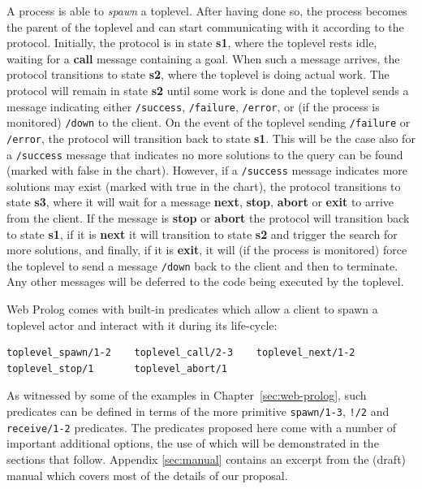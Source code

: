 A process is able to \textit{spawn} a toplevel. After having done so, the process becomes the parent of the toplevel and can start communicating with it according to the protocol. Initially, the protocol is in state \textbf{s1}, where the toplevel rests idle, waiting for a \textbf{call} message containing a goal. When such a message arrives, the protocol transitions to state \textbf{s2}, where the toplevel is doing actual work. The protocol will remain in state \textbf{s2} until some work is done and the toplevel sends a message indicating either \texttt{/success}, \texttt{/failure}, \texttt{/error}, or (if the process is monitored) \texttt{/down} to the client. On the event of the toplevel sending \texttt{/failure} or \texttt{/error}, the protocol will transition back to state \textbf{s1}. This will be the case also for a \texttt{/success} message that indicates no more solutions to the query can be found (marked with false in the chart). However, if a \texttt{/success} message indicates more solutions may exist (marked with true in the chart), the protocol transitions to state \textbf{s3}, where it will wait for a message \textbf{next}, \textbf{stop}, \textbf{abort} or \textbf{exit} to arrive from the client. If the message is \textbf{stop} or \textbf{abort} the protocol will transition back to state \textbf{s1}, if it is \textbf{next} it will transition to state \textbf{s2} and trigger the search for more solutions, and finally, if it is \textbf{exit}, it will (if the process is monitored) force the toplevel to send a message \texttt{/down} back to the client and then to terminate. Any other messages will be deferred to the code being executed by the toplevel.

Web Prolog comes with built-in predicates which allow a client to spawn a toplevel actor and interact with it during its life-cycle:

\begin{verbatim}
toplevel_spawn/1-2    toplevel_call/2-3    toplevel_next/1-2
toplevel_stop/1       toplevel_abort/1 
\end{verbatim}

\noindent As witnessed by some of the examples in Chapter~\ref{sec:web-prolog}, such predicates can be defined in terms of the more primitive \texttt{spawn/1-3}, \texttt{!/2} and \texttt{receive/1-2} predicates. The predicates proposed here come with a number of important additional options, the use of which will be demonstrated in the sections that follow. Appendix \ref{sec:manual} contains an excerpt from the (draft) manual which covers most of the details of our proposal.

